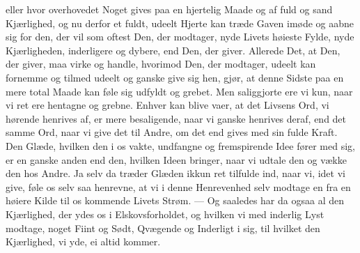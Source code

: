 \documentclass[12pt,a4paper]{book}
\newcommand{\apage}[1]{\marginnote{\footnotesize\textit{[#1]}}}
\begin{document}
eller hvor overhovedet Noget gives paa en hjertelig Maade og af fuld og
sand Kjærlighed, og nu derfor et fuldt, udeelt Hjerte kan træde Gaven
imøde og aabne sig for den, der vil som oftest Den, der modtager, nyde
Livets høieste Fylde, nyde Kjærligheden, inderligere og dybere, end
Den, der giver. Allerede Det, at Den, der giver, maa virke og handle,
hvorimod Den, der modtager, udeelt kan fornemme og tilmed udeelt og
ganske give sig hen, gjør, at denne Sidste paa en mere total Maade kan
føle sig udfyldt og grebet. Men saliggjorte ere vi kun, naar vi ret ere
hentagne og grebne. Enhver kan blive vaer, at det Livsens Ord, vi
hørende henrives af, er mere besaligende, naar vi ganske henrives
deraf, end det samme Ord, naar vi give det til Andre, om det end gives
med sin fulde Kraft. Den Glæde, hvilken den i os vakte, undfangne og
fremspirende Idee fører med sig, er en ganske anden end den, hvilken
Ideen bringer, naar vi udtale den og vække den hos Andre. Ja selv da
træder Glæden ikkun ret tilfulde ind, naar vi, idet vi give, føle os
selv saa henrevne, at vi i denne Henrevenhed selv \apage{26} modtage en fra en
høiere Kilde til os kommende Livets Strøm. --- Og saaledes har da ogsaa
al den Kjærlighed, der ydes os i Elskovsforholdet, og hvilken vi med
inderlig Lyst modtage, noget Fiint og Sødt, Qvægende og Inderligt i
sig, til hvilket den Kjærlighed, vi yde, ei altid kommer.
\end{document}
